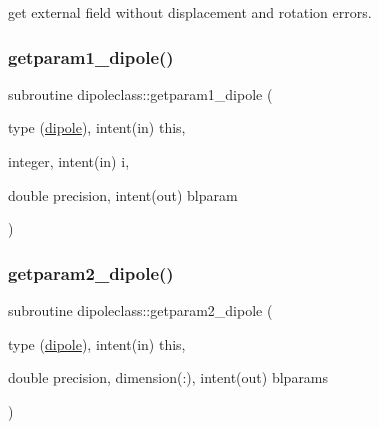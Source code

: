 get external field without displacement and rotation errors. 

\mbox{\label{namespacedipoleclass_af02462235721b966a71753610096e85a}} 
\subsubsection{\texorpdfstring{getparam1\_dipole()}{getparam1\_dipole()}}
{\footnotesize\ttfamily subroutine dipoleclass\+::getparam1\+\_\+dipole (\begin{DoxyParamCaption}\item[{type (\mbox{\hyperlink{namespacedipoleclass_structdipoleclass_1_1dipole}{dipole}}), intent(in)}]{this,  }\item[{integer, intent(in)}]{i,  }\item[{double precision, intent(out)}]{blparam }\end{DoxyParamCaption})}

\mbox{\label{namespacedipoleclass_af793a317f0b5d337d6818755609641a7}} 
\subsubsection{\texorpdfstring{getparam2\_dipole()}{getparam2\_dipole()}}
{\footnotesize\ttfamily subroutine dipoleclass\+::getparam2\+\_\+dipole (\begin{DoxyParamCaption}\item[{type (\mbox{\hyperlink{namespacedipoleclass_structdipoleclass_1_1dipole}{dipole}}), intent(in)}]{this,  }\item[{double precision, dimension(\+:), intent(out)}]{blparams }\end{DoxyParamCaption})}

\mbox{\label{namespacedipoleclass_a6a7322bcea3d9d07affd0628002985fd}} 
